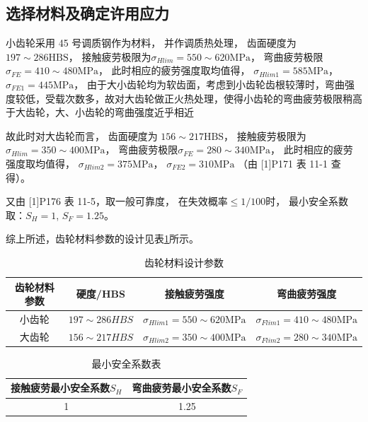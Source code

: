 \documentclass[12pt]{ctexart}
\begin{document}
\subsection{选择材料及确定许用应力}

小齿轮采用 45 号调质钢作为材料，
并作调质热处理，
齿面硬度为 $197\sim 286\text{HBS}$，
接触疲劳极限为$\sigma_{Hlim}=550\sim 620\text{MPa}$，
弯曲疲劳极限$\sigma_{FE}=410\sim 480\text{MPa}$，
此时相应的疲劳强度取均值得，
$\sigma_{Hlim1} = 585\text{MPa}$，
$\sigma_{FE1}=445\text{MPa}$，
由于大小齿轮均为软齿面，考虑到小齿轮齿根较薄时，弯曲强度较低，受载次数多，故对大齿轮做正火热处理，使得小齿轮的弯曲疲劳极限稍高于大齿轮，大、小齿轮的弯曲强度近乎相近

故此时对大齿轮而言，
齿面硬度为 $156\sim 217\text{HBS}$，
接触疲劳极限为$\sigma_{Hlim}=350\sim 400\text{MPa}$，
弯曲疲劳极限$\sigma_{FE}=280\sim 340\text{MPa}$，
此时相应的疲劳强度取均值得，
$\sigma_{Hlim2} = 375\text{MPa}$，
$\sigma_{FE2}= 310\text{MPa}$
（由 [1]P171 表 11-1 查得）。

又由 [1]P176 表 11-5，取一般可靠度，
在失效概率$\le 1/100$时，
最小安全系数取：$S_H=1$, $S_F=1.25$。

综上所述，齿轮材料参数的设计见表\ref{label_1}所示。

\begin{table}[htbp]
    \centering
    \begin{tabular}{c c c c}
        \toprule
        \textbf{齿轮材料参数} & \textbf{硬度/HBS} & \textbf{接触疲劳强度} & \textbf{弯曲疲劳强度} \\
        \midrule
        小齿轮 & $197\sim 286 HBS$ &  $\sigma_{Hlim1} = 550\sim 620\text{MPa}$ & $\sigma_{Flim1} = 410\sim 480\text{MPa}$ \\
        大齿轮 & $156\sim 217 HBS$ & $\sigma_{Hlim2} = 350\sim 400\text{MPa}$ & $\sigma_{Flim2} = 280\sim 340\text{MPa}$ \\
        \bottomrule
    \end{tabular}
    \caption{齿轮材料设计参数}
    \label{label_1}
\end{table}


\begin{table}[htbp]
	\centering
	\begin{tabular}{cc}
		\toprule
		接触疲劳最小安全系数$S_H$ & 弯曲疲劳最小安全系数$S_F$ \\
		\midrule
		 1 & 1.25 \\
		\bottomrule
	\end{tabular}
\caption{最小安全系数表}
\end{table}
\end{document}
